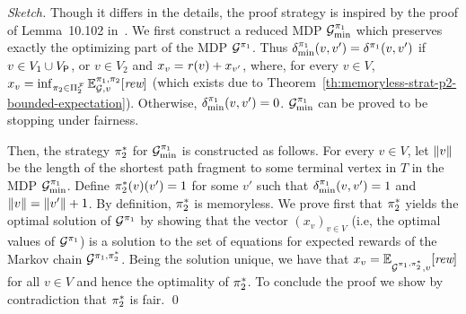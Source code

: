 \begin{proof}[Sketch]
  Though it differs in the details, the proof strategy is inspired by
  the proof of Lemma~10.102 in~\cite{BaierK08}.
  We first construct a reduced MDP $\mathcal{G}^{\pi_{1}}_{\min}$ which
  preserves exactly the optimizing part of the MDP
  $\mathcal{G}^{\pi_{1}}$.
  Thus $\delta^{\pi_{1}}_{\min}(v,v')=\delta^{\pi_{1}}(v,v')$ if
  $v\in V_1\cup V_{\mathsf{P}}$, or $v\in V_2$ and
  $x_v=\mathit{r}(v)+x_{v'}$, where, for every $v\in V$,
  $x_v = \inf_{\pi_{2} \in \Pi^{\mathcal{F}}_{2}} \mathbb{E}^{\pi_{1}, \pi_{2}}_{\mathcal{G},v}[\textit{rew}]$
  (which exists due to Theorem~\ref{th:memoryless-strat-p2-bounded-expectation}).
  Otherwise, $\delta^{\pi_{1}}_{\min}(v,v')=0$.
  $\mathcal{G}^{\pi_{1}}_{\min}$ can be proved to be stopping under fairness.

  Then, the strategy $\pi^*_{2}$ for
  $\mathcal{G}^{\pi_{1}}_{\min}$ is constructed as follows.  For every
  $v\in V$, let ${\lVert{v}\rVert}$ be the length of the shortest path
  fragment to some terminal vertex in $T$ in the MDP
  $\mathcal{G}^{\pi_{1}}_{\min}$.  Define $\pi^*_{2}(v)(v')=1$
  for some $v'$ such that $\delta^{\pi_{1}}_{\min}(v,v')=1$ and
  ${\lVert{v}\rVert}={\lVert{v'}\rVert}+1$.
  By definition, $\pi^*_{2}$ is  memoryless.  We prove first that
  $\pi^*_{2}$ yields the optimal solution of
  $\mathcal{G}^{\pi_{1}}$ by showing that the vector $(x_v)_{v\in V}$
  (i.e, the optimal values of $\mathcal{G}^{\pi_{1}}$) is a solution to
  the set of equations for expected rewards of the Markov chain
  $\mathcal{G}^{\pi_{1},\pi^*_{2}}$.  Being the solution unique,
  we have that
  $x_v=\mathbb{E}^{}_{\mathcal{G}^{\pi_{1},\pi^*_{2}},v}[\textit{rew}]$
  for all $v\in V$ and hence the optimality of $\pi^*_{2}$.
  To conclude the proof we show by contradiction that
  $\pi^*_{2}$ is fair.
\qed
\end{proof}
\fi
